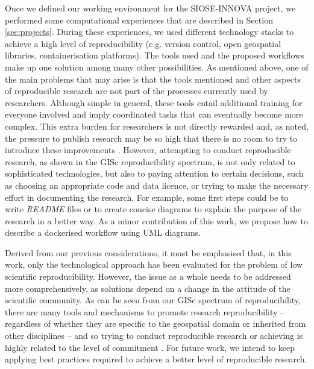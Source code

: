 \documentclass[ijgi,article,submit,moreauthors,pdftex]{Definitions/mdpi}
\begin{document}
Once we defined our working environment for the SIOSE-INNOVA project, we performed some computational experiences that are described in Section \ref{sec:projects}. During these experiences, we used different technology stacks to achieve a high level of reproducibility (e.g. version control, open geospatial libraries, containerisation platforms). The tools used and the proposed workflows make up one solution among many other possibilities. As mentioned above, one of the main problems that may arise is that the tools mentioned and other aspects of reproducible research are not part of the processes currently used by researchers. Although simple in general, these tools entail additional training for everyone involved and imply coordinated tasks that can eventually become more complex. This extra burden for researchers is not directly rewarded and, as noted, the pressure to publish research may be so high that there is no room to try to introduce these improvements \cite{Baker2016}. However, attempting to conduct reproducible research, as shown in the GISc reproducibility spectrum, is not only related to sophisticated technologies, but also to paying attention to certain decisions, such as choosing an appropriate code and data licence, or trying to make the necessary effort in documenting the research. For example, some first steps could be to write \textit{README} files or to create concise diagrams to explain the purpose of the research in a better way. As a minor contribution of this work, we propose how to describe a dockerised workflow using UML diagrams.

Derived from our previous considerations, it must be emphasised that, in this work, only the technological approach has been evaluated for the problem of low scientific reproducibility. However, the issue as a whole needs to be addressed more comprehensively, as solutions depend on a change in the attitude of the scientific community. As can be seen from our GISc spectrum of reproducibility, there are many tools and mechanisms to promote research reproducibility -- regardless of whether they are specific to the geospatial domain or inherited from other disciplines -- and so trying to conduct reproducible research or achieving is highly related to the level of commitment \cite{nust2018reproducible}. For future work, we intend to keep applying best practices required to achieve a better level of reproducible research. 


\vspace{6pt} 
\end{document}

